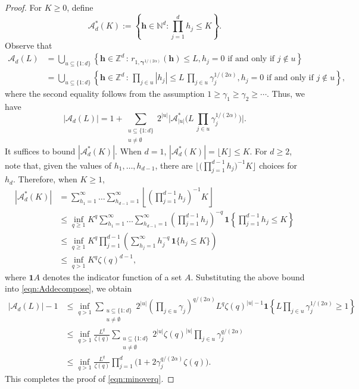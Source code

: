 \documentclass[pdflatex,sn-basic,Numbered]{sn-jnl}%
\newcommand{\bsh}{\boldsymbol{h}}
\newcommand{\bsgamma}{\boldsymbol{\gamma}}
\newcommand{\NN}{\mathbb{N}}
\newcommand{\ZZ}{\mathbb{Z}}
\newcommand{\Acal}{\mathcal{A}}
\newcommand{\bsone}{\boldsymbol{1}}
\theoremstyle{thmstyleone}%
\theoremstyle{thmstyletwo}%
\begin{document}
\begin{proof} 
For $K\geq 0$, define
\[ 
\Acal^*_d(K) :=\left\{\bsh\in \NN^d : \prod_{j=1}^d h_j \leq  K\right\}.
\]
Observe that
\begin{align*}
    \Acal_d(L)&=\bigcup_{u\subseteq \{1{:}d\}}\left\{\bsh\in \ZZ^d \, \colon\, r_{1, \bsgamma^{1/(2\alpha)}}(\bsh) \leq L,h_j=0 \text{ if and only if }j\notin u\right\}\\
    &=\bigcup_{u\subseteq \{1{:}d\}}\left\{\bsh\in \ZZ^d \, \colon\,  \prod_{j\in u} |h_j| \leq L\,\prod_{j\in u} \gamma_j^{1/(2\alpha)},h_j=0 \text{ if and only if }j\notin u\right\},
\end{align*}
where the second equality follows from the assumption $1\ge \gamma_1 \ge \gamma_2 \ge \cdots$. 
Thus, we have
\begin{equation}\label{eqn:Addecompose}
    |\Acal_d(L)|=1+\sum_{\substack{u\subseteq \{1{:}d\}\\u\neq\emptyset}} 2^{|u|} \Big|\Acal^*_{|u|}\Big(L\,\prod_{j\in u} \gamma_j^{1/(2\alpha)}\Big)\Big|. 
\end{equation}
It suffices to bound $|\Acal^*_d(K)|$. When $d=1$, $|\Acal^*_d(K)|=\lfloor K\rfloor\leq K$. For $d\ge 2$, note that, given the values of $h_1,\dots,h_{d-1}$, there are $\Big\lfloor \Big(\prod_{j=1}^{d-1}h_j\Big)^{-1}K\Big\rfloor$ choices for $h_d$. 
Therefore, when $K\geq 1$,
\begin{align}\label{eqn:Adstarbound}
    |\Acal^*_d(K)|&=\sum_{h_1=1}^\infty \dots \sum_{h_{d-1}=1}^\infty \left\lfloor \left(\prod_{j=1}^{d-1}h_j\right)^{-1}K\right\rfloor\nonumber \\
    &\leq \inf_{q\geq 1} K^q\sum_{h_1=1}^\infty \dots \sum_{h_{d-1}=1}^\infty  \left(\prod_{j=1}^{d-1}h_j\right)^{-q}\,\bsone\left\{\prod_{j=1}^{d-1}h_j\leq K\right\}\nonumber\\
    &\leq \inf_{q\geq 1} K^q \prod_{j=1}^{d-1}\left(\sum_{h_j=1}^\infty h_j^{-q}\,\bsone\{h_j\leq K\}\right) \\
    &\leq \inf_{q> 1} K^q \zeta(q)^{d-1}, \nonumber
\end{align}
where $\bsone A$ denotes 
the indicator function of a set $A$. 
Substituting the above bound into \eqref{eqn:Addecompose}, we obtain
\begin{align}\label{eqn:Adboundsumu}
    |\Acal_d(L)|-1&\leq \inf_{q>1}  \sum_{\substack{u\subseteq \{1{:}d\}\\u\neq \emptyset}} 2^{|u|} \left(\prod_{j\in u} \gamma_j\right)^{q/(2\alpha)} L^q \zeta(q)^{|u|-1}\bsone\left\{L\prod_{j\in u} \gamma_j^{1/(2\alpha)} \ge 1\right\}\\
    & \leq   \inf_{q>1}  \frac{L^q}{\zeta(q)} \sum_{\substack{u\subseteq \{1{:}d\}\\u\neq \emptyset}} 2^{|u|} 
    \zeta(q)^{|u|} \prod_{j\in u} \gamma_j^{q/(2\alpha)} \nonumber\\
    &\le \inf_{q>1}  \frac{L^{q}}{\zeta(q)} \prod_{j=1}^d \Big(1+2\gamma^{q/(2\alpha)}_j \zeta(q)\Big).\nonumber
\end{align}
This completes the proof of \eqref{eqn:minoverq}.


\end{proof}
\end{document}
